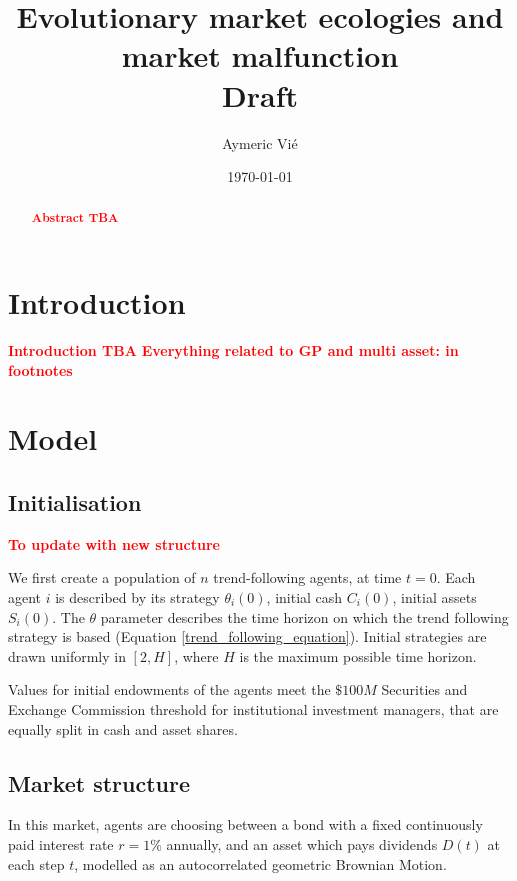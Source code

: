 \documentclass{article}
\title{Evolutionary market ecologies and market malfunction\\
Draft}
\author{Aymeric Vi\'{e}}
\date{\today}
\newcommand\boldred[1]{\textcolor{red}{\textbf{#1}}}
\begin{document}
\maketitle

\tableofcontents

\clearpage

\begin{abstract}
    \boldred{Abstract TBA}
\end{abstract}

\section{Introduction}
\boldred{Introduction TBA}
\boldred{Everything related to GP and multi asset: in footnotes}

\section{Model}

\subsection{Initialisation}
\boldred{To update with new structure}

We first create a population of $n$ trend-following agents, at time $t=0$. Each agent $i$ is described by its strategy $\theta_i(0)$, initial cash $C_i(0)$, initial assets $S_i(0)$. The $\theta$ parameter describes the time horizon on which the trend following strategy is based (Equation \ref{trend_following_equation}). Initial strategies are drawn uniformly in $[2,H]$, where $H$ is the maximum possible time horizon. \par
Values for initial endowments of the agents meet the $\$100M$ Securities and Exchange Commission threshold for institutional investment managers, that are equally split in cash and asset shares. 

\subsection{Market structure}

In this market, agents are choosing between a bond with a fixed continuously paid interest rate $r = 1\%$ annually, and an asset which pays dividends $D(t)$ at each step $t$, modelled as an autocorrelated geometric Brownian Motion.
\end{document}
